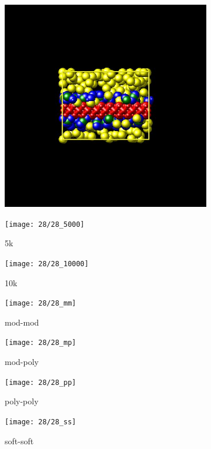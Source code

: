 \documentclass[a4paper]{article}
\begin{document}
\begin{figure}[H]
\begin{subfigure}{0.3\textwidth}
  \centering
  \includegraphics[width=\linewidth,keepaspectratio]{start}
  \caption{}
\end{subfigure}
\begin{subfigure}{0.3\textwidth}
  \centering
  \texttt{[image: 28/28\_5000]}
  \caption{5k}
\end{subfigure}
\begin{subfigure}{0.3\textwidth}
  \centering
  \texttt{[image: 28/28\_10000]}
  \caption{10k}
\end{subfigure}
\caption{}
\label{fig_1}
\end{figure}

\begin{figure}[H]
\begin{subfigure}{0.24\textwidth}
  \centering
  \texttt{[image: 28/28\_mm]}
  \caption{mod-mod}
\end{subfigure}
\begin{subfigure}{0.24\textwidth}
  \centering
  \texttt{[image: 28/28\_mp]}
  \caption{mod-poly}
\end{subfigure}
\begin{subfigure}{0.24\textwidth}
  \centering
  \texttt{[image: 28/28\_pp]}
  \caption{poly-poly}
\end{subfigure}
\begin{subfigure}{0.24\textwidth}
  \centering
  \texttt{[image: 28/28\_ss]}
  \caption{soft-soft}
\end{subfigure}
\caption{}
\label{fig_1}
\end{figure}
\end{document}
